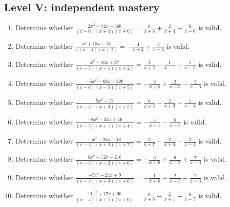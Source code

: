 \documentclass[11pt,oneside]{book}
\begin{document}
\subsection*{Level V: independent mastery}
\begin{enumerate}[leftmargin=*,label=\textbf{\arabic*.},itemsep=0.65\baselineskip]
\item Determine whether $\displaystyle \frac{2 x^{2} - 72 x - 360}{\left(x - 6\right) \left(x + 4\right) \left(x + 6\right)}=\frac{6}{x + 6} + \frac{2}{x + 4} - \frac{6}{x - 6}$ is valid.
\item Determine whether $\displaystyle \frac{x^{2} + 18 x - 16}{x \left(x - 4\right) \left(x + 2\right)}=- \frac{4}{x + 2} + \frac{3}{x - 4}$ is valid.
\item Determine whether $\displaystyle \frac{x^{2} - 16 x + 27}{\left(x - 5\right) \left(x - 1\right) \left(x + 2\right)}=\frac{3}{x + 2} - \frac{1}{x - 1} - \frac{1}{x - 5}$ is valid.
\item Determine whether $\displaystyle \frac{- 5 x^{2} + 63 x - 220}{\left(x - 6\right) \left(x - 5\right) \left(x + 5\right)}=- \frac{6}{x + 5} + \frac{2}{x - 5} - \frac{2}{x - 6}$ is valid.
\item Determine whether $\displaystyle \frac{5 x^{2} - 17}{\left(x - 4\right) \left(x + 3\right) \left(x + 5\right)}=\frac{6}{x + 5} - \frac{2}{x + 3} + \frac{1}{x - 4}$ is valid.
\item Determine whether $\displaystyle \frac{- 8 x^{2} - 34 x + 46}{\left(x - 5\right) \left(x + 1\right) \left(x + 4\right)}=- \frac{4}{x + 1} - \frac{6}{x - 5}$ is valid.
\item Determine whether $\displaystyle \frac{- x^{2} - 28 x - 48}{\left(x - 4\right) \left(x + 4\right) \left(x + 7\right)}=\frac{3}{x + 7} - \frac{2}{x + 4} - \frac{2}{x - 4}$ is valid.
\item Determine whether $\displaystyle \frac{6 x^{2} + 72 x - 216}{\left(x - 3\right) \left(x - 2\right) \left(x + 6\right)}=- \frac{6}{x + 6} + \frac{6}{x - 2} + \frac{7}{x - 3}$ is valid.
\item Determine whether $\displaystyle \frac{- 5 x^{2} - 24 x + 9}{\left(x - 3\right) \left(x + 3\right) \left(x + 6\right)}=- \frac{1}{x + 6} - \frac{2}{x + 3} - \frac{2}{x - 3}$ is valid.
\item Determine whether $\displaystyle \frac{11 x^{2} + 17 x + 36}{\left(x - 5\right) \left(x + 1\right) \left(x + 6\right)}=\frac{6}{x + 6} - \frac{2}{x + 1} + \frac{6}{x - 5}$ is valid.
\end{enumerate}
\end{document}
